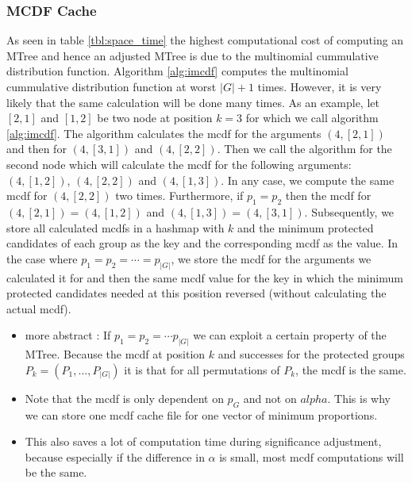 \subsubsection{MCDF Cache}\label{subsubsec:mcdf-cache}
As seen in table \ref{tbl:space_time} the highest computational cost of computing an MTree and hence an adjusted MTree is due to the multinomial cummulative distribution function. Algorithm \ref{alg:imcdf} computes the multinomial cummulative distribution function at worst $|G|+1$ times. However, it is very likely that the same calculation will be done many times. As an example, let $[2,1]$ and $[1,2]$ be two node at position $k=3$ for which we call algorithm \ref{alg:imcdf}. The algorithm calculates the mcdf for the arguments $(4,[2,1])$ and then for $(4,[3,1])$ and $(4,[2,2])$. Then we call the algorithm for the second node which will calculate the mcdf for the following arguments: $(4,[1,2])$, $(4,[2,2])$ and $(4,[1,3])$. In any case, we compute the same mcdf for $(4,[2,2])$ two times. Furthermore, if $p_1 = p_2$ then the mcdf for $(4,[2,1]) = (4,[1,2])$ and  $(4,[1,3]) = (4,[3,1])$. Subsequently, we store all calculated mcdfs in a hashmap with $k$ and the minimum protected candidates of each group as the key and the corresponding mcdf as the value. In the case where $p_1 = p_2 = \cdots = p_{|G|}$, we store the mcdf for the arguments we calculated it for and then the same mcdf value for the key in which the minimum protected candidates needed at this position reversed (without calculating the actual mcdf).
\begin{itemize}
\item more abstract : If $p_1 = p_2 = \cdots p_{|G|}$ we can exploit a certain property of the MTree. Because the mcdf at position $k$ and successes for the protected groups $P_k = (P_1, ..., P_{|G|})$ it is that for all permutations of $P_k$, the mcdf is the same.
\item Note that the mcdf is only dependent on $p_G$ and not on $alpha$. This is why we can store one mcdf cache file for one vector of minimum proportions.
\item This also saves a lot of computation time during significance adjustment, because especially if the difference in $\alpha$ is small, most mcdf computations will be the same.

\end{itemize}
